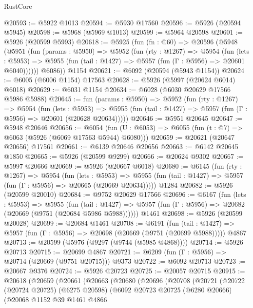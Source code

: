 \begin{lexlean}{RustCore}
\begin{coremodule}
@20593 := @5922 @1013
@20594 := @5930 @17560
@20596 := @5926 (@20594 @5945)
@20598 := @5968 (@5969 @1013)
@20599 := @5964 @20598
@20601 := @5926 (@20599 @5993)
@20618 := @5925
    (fun (fn : @60) =>
    @20596
      (@5948
        (@5951
          (fun (params : @5950) =>
          @5952
            (fun (rty : @1267) =>
            @5954
              (fun (lets : @5953) =>
              @5955 (fun (tail : @1427) => @5957 (fun (Γ : @5956) => @20601 @6040))))))
        @6086))
    @1154
@20621 := @6092 (@20594 (@5943 @1154))
@20624 := @6005 (@6006 @1154) @17563
@20628 := @5926 (@5997 (@20624 @6014) @6018)
@20629 := @6031 @1154
@20634 := @6028 (@6030 @20629 @17566 @5986 @5988)
@20645 := fun (params : @5950) =>
  @5952
    (fun (rty : @1267) =>
    @5954
      (fun (lets : @5953) =>
      @5955 (fun (tail : @1427) => @5957 (fun (Γ : @5956) => @20601 (@20628 @20634)))))
@20646 := @5951 @20645
@20647 := @5948 @20646
@20656 := @6054
    (fun (U : @6053) => @6055 (fun (t : @7) => @6063 (@5926 (@6069 @17563 @5944) @6080)))
@20659 := @20621 (@20647 @20656) @17561
@20661 := @6139 @20646 @20656
@20663 := @6142 @20645 @1850
@20665 := @5926 (@20599 @9299)
@20666 := @20624 @9302
@20667 := @5997 @20666
@20669 := @5926 (@20667 @6018)
@20680 := @6145
    (fun (rty : @1267) =>
    @5954
      (fun (lets : @5953) =>
      @5955 (fun (tail : @1427) => @5957 (fun (Γ : @5956) => @20665 (@20669 @20634)))))
    @1284
@20682 := @5926 (@20599 @20010)
@20684 := @9752 @20629 @17566
@20696 := @6167
    (fun (lets : @5953) =>
    @5955
      (fun (tail : @1427) =>
      @5957 (fun (Γ : @5956) => @20682 (@20669 (@9751 (@20684 @5986 @5988))))))
    @1461
@20698 := @5926 (@20599 @20028)
@20699 := @20684 @1461
@20708 := @6191
    (fun (tail : @1427) => @5957 (fun (Γ : @5956) => @20698 (@20669 (@9751 (@20699 @5988)))))
    @4867
@20713 := @20599 (@5976 (@9297 (@9744 (@5985 @4868))))
@20714 := @5926 @20713
@20715 := @20699 @4867
@20721 := @6209 (fun (Γ : @5956) => @20714 (@20669 (@9751 @20715))) @9373
@20722 := @6092 @20713
@20723 := @20667 @9376
@20724 := @5926 @20723
@20725 := @20057 @20715
@20915 := @20618
    (@20659
      (@20661
        (@20663
          (@20680
            (@20696
              (@20708
                (@20721
                  (@20722
                    (@20724 @20725)
                    (@6275 @20598)
                    (@6092
                      @20723
                      @20725
                      (@6280 @20666)
                      (@20068
                        @1152
                        @39
                        @1461
                        @4866

\end{coremodule}
\end{lexlean}
